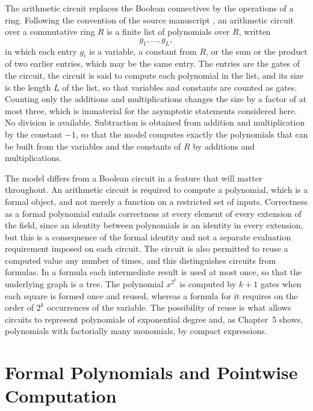 \documentclass[11pt,letterpaper]{report}
\theoremstyle{plain}
\theoremstyle{definition}
\theoremstyle{remark}
\begin{document}
The arithmetic circuit replaces the Boolean connectives by the operations of a ring. Following the convention of the source manuscript \cite{Source2026}, an arithmetic circuit over a commutative ring $R$ is a finite list of polynomials over $R$, written
\[
g_1,\ldots,g_L,
\]
in which each entry $g_i$ is a variable, a constant from $R$, or the sum or the product of two earlier entries, which may be the same entry. The entries are the gates of the circuit, the circuit is said to compute each polynomial in the list, and its size is the length $L$ of the list, so that variables and constants are counted as gates. Counting only the additions and multiplications changes the size by a factor of at most three, which is immaterial for the asymptotic statements considered here. No division is available. Subtraction is obtained from addition and multiplication by the constant $-1$, so that the model computes exactly the polynomials that can be built from the variables and the constants of $R$ by additions and multiplications.

The model differs from a Boolean circuit in a feature that will matter throughout. An arithmetic circuit is required to compute a polynomial, which is a formal object, and not merely a function on a restricted set of inputs. Correctness as a formal polynomial entails correctness at every element of every extension of the field, since an identity between polynomials is an identity in every extension, but this is a consequence of the formal identity and not a separate evaluation requirement imposed on each circuit. The circuit is also permitted to reuse a computed value any number of times, and this distinguishes circuits from formulas. In a formula each intermediate result is used at most once, so that the underlying graph is a tree. The polynomial $x^{2^k}$ is computed by $k+1$ gates when each square is formed once and reused, whereas a formula for it requires on the order of $2^k$ occurrences of the variable. The possibility of reuse is what allows circuits to represent polynomials of exponential degree and, as Chapter~5 shows, polynomials with factorially many monomials, by compact expressions.

\section{Formal Polynomials and Pointwise Computation}
\end{document}

